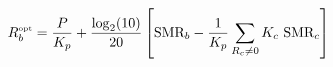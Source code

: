 \documentclass{article}
\begin{document}
 
\[
R_b^{\mbox{\tiny opt}} = \frac{P}{K_p} + \frac{\log_2(10)}{20} \left[ \mbox{SMR}_b - \frac{1}{K_p}  \sum_{R_c \ne 0}  K_c \  \mbox{SMR}_c \right]
\]
 \newpage 
\end{document}

